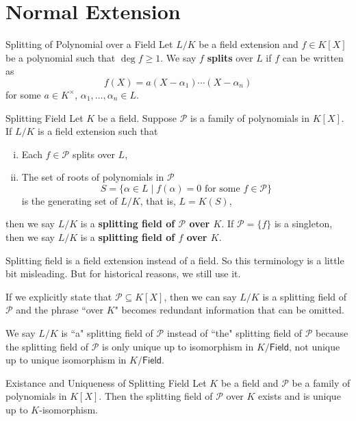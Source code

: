 \section{Normal Extension}

\begin{definition}{Splitting of Polynomial over a Field}{}
    Let $L/K$ be a field extension and $f\in K[X]$ be a polynomial such that $\deg f \ge 1$. We say $f$ \textbf{splits} over $L$ if $f$ can be written as
    \[
    f(X)=a(X-\alpha_1)\cdots(X-\alpha_n)
    \]
    for some $a\in K^\times$, $\alpha_1,\ldots,\alpha_n\in L$.
\end{definition}

\begin{definition}{Splitting Field}{}
    Let $K$ be a field. Suppose $\mathcal{P}$ is a family of polynomials in $K[X]$. If $L/K$ is a field extension such that 
    \begin{enumerate}[(i)]
        \item Each $f\in \mathcal{P}$ splits over $L$,
        \item The set of roots of polynomials in $\mathcal{P}$ 
        \[
        S=\{\alpha\in L\mid f(\alpha)=0\text{ for some }f\in \mathcal{P}\}
        \]
        is the generating set of $L/K$, that is, $L=K(S)$,
    \end{enumerate}
    then we say $L/K$ is a \textbf{splitting field of $\mathcal{P}$ over $K$}. If $\mathcal{P}=\{f\}$ is a singleton, then we say $L/K$ is a \textbf{splitting field of $f$ over $K$}.
\end{definition}
\begin{remark}
    Splitting field is a field extension instead of a field. So this terminology is a little bit misleading. But for historical reasons, we still use it.

    If we explicitly state that $\mathcal{P}\subseteq K[X]$, then we can say $L/K$ is a splitting field of $\mathcal{P}$ and the phrase ``over $K$" becomes redundant information that can be omitted.

    We say $L/K$ is ``a" splitting field of $\mathcal{P}$ instead of ``the" splitting field of $\mathcal{P}$ because the splitting field of $\mathcal{P}$ is only unique up to isomorphism in $K/\mathsf{Field}$, not unique up to unique isomorphism in $K/\mathsf{Field}$.
\end{remark}

\begin{proposition}{Existance and Uniqueness of Splitting Field}{}
    Let $K$ be a field and $\mathcal{P}$ be a family of polynomials in $K[X]$. Then the splitting field of $\mathcal{P}$ over $K$ exists and is unique up to $K$-isomorphism.
    
\end{proposition}

